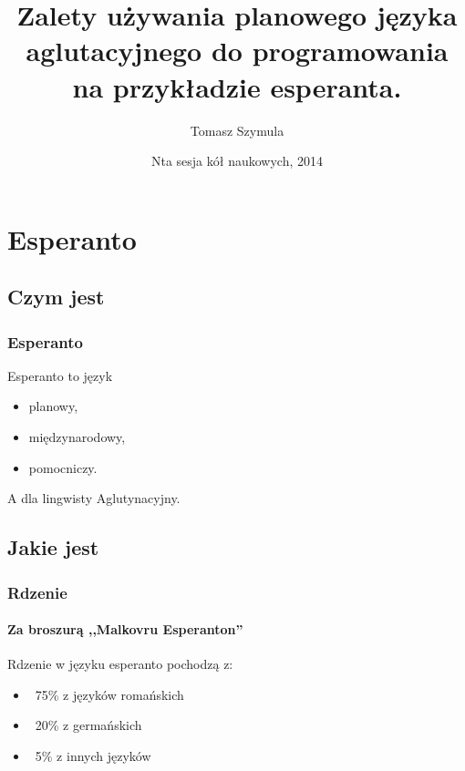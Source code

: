 \documentclass{beamer}
\title[Esperanto w programowaniu]{Zalety używania planowego języka aglutacyjnego do programowania na przykładzie esperanta.}
\author{Tomasz Szymula}
\institute[PEJ]{Koło naukowe Blabel, AGH}
\date[2014]{Nta sesja kół naukowych, 2014}
\begin{document}
  \frame{\titlepage}
 
  \section{Esperanto}
  \subsection{Czym jest} 
  
  \begin{frame}
  	\frametitle{Esperanto}
  	
  	\begin{block}{Esperanto to język}
  		\begin{itemize}
  			\item planowy,
			\item międzynarodowy,
			\item pomocniczy.
		\end{itemize}
  	\end{block}
  	
  	\pause

	\begin{block}{A dla lingwisty}
		Aglutynacyjny. 
	\end{block}  	
  	
  \end{frame}
 
  
  
  \subsection{Jakie jest}
  
  \begin{frame}
  	\frametitle{Rdzenie}
  	\framesubtitle{Za broszurą ,,Malkovru Esperanton''}
	Rdzenie w języku esperanto pochodzą z:
	\begin{itemize}
		\item ~75\% z języków romańskich
		\item ~20\% z germańskich
		\item ~5\% z innych języków
	\end{itemize}
		
  \end{frame}
  
\end{document}
